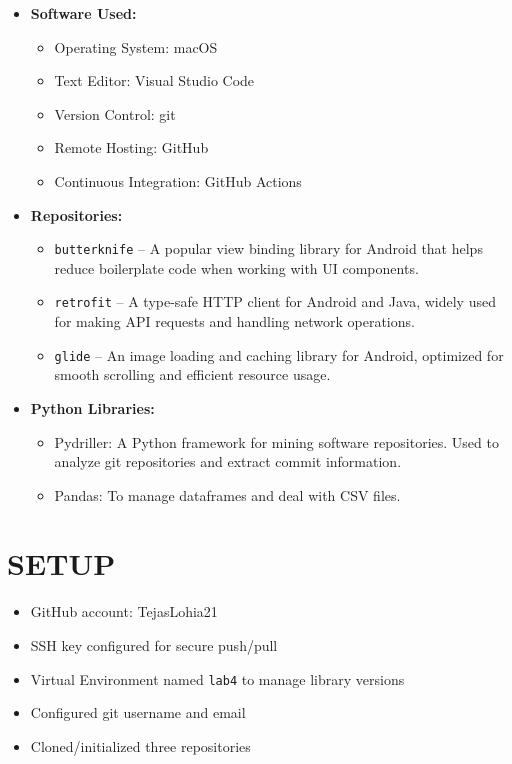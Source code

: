 \documentclass[12pt, a4paper]{report}
\begin{document}
\begin{itemize}
    \item \textbf{Software Used:}
    \begin{itemize}
        \item Operating System: macOS
        \item Text Editor: Visual Studio Code
        \item Version Control: git
        \item Remote Hosting: GitHub
        \item Continuous Integration: GitHub Actions
    \end{itemize}
    
    \item \textbf{Repositories:}
    \begin{itemize}
        \item \texttt{butterknife} -- A popular view binding library for Android that helps reduce boilerplate code when working with UI components. 
        \item \texttt{retrofit} -- A type-safe HTTP client for Android and Java, widely used for making API requests and handling network operations.
        \item \texttt{glide} -- An image loading and caching library for Android, optimized for smooth scrolling and efficient resource usage.
    \end{itemize}
    
    \item \textbf{Python Libraries:}
    \begin{itemize}
        \item Pydriller: A Python framework for mining software repositories. Used to analyze git repositories and extract commit information.
        \item Pandas: To manage dataframes and deal with CSV files.
    \end{itemize}
\end{itemize}

\section{SETUP}

\begin{itemize}
    \item GitHub account: TejasLohia21
    \item SSH key configured for secure push/pull
    \item Virtual Environment named \texttt{lab4} to manage library versions
    \item Configured git username and email
    \item Cloned/initialized three repositories
\end{itemize}
\end{document}
